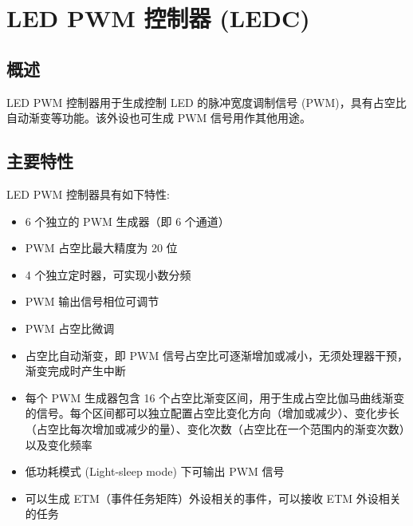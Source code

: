 \documentclass[main\_\_CN.tex]{subfiles}
\begin{document}

\ifglobal
\else
    \listoftodos
    {\let\clearpage\relax \listofdonetodos}
    \tableofcontents
\fi



\hypertarget{ledpwm}{}
\chapter{LED PWM 控制器 (LEDC)}
\label{mod:ledpwm}

\section{概述}

LED PWM 控制器用于生成控制 LED 的脉冲宽度调制信号 (PWM)，具有占空比自动渐变等功能。该外设也可生成 PWM 信号用作其他用途。

\section{主要特性}
LED PWM 控制器具有如下特性:

\begin{itemize}
    \item 6 个独立的 PWM 生成器（即 6 个通道）
    \item PWM 占空比最大精度为 20 位
    \item 4 个独立定时器，可实现小数分频
    \item PWM 输出信号相位可调节
    \item PWM 占空比微调
    \item 占空比自动渐变，即 PWM 信号占空比可逐渐增加或减小，无须处理器干预，渐变完成时产生中断
    \item 每个 PWM 生成器包含 16 个占空比渐变区间，用于生成占空比伽马曲线渐变的信号。每个区间都可以独立配置占空比变化方向（增加或减少）、变化步长（占空比每次增加或减少的量）、变化次数（占空比在一个范围内的渐变次数）以及变化频率
    \item 低功耗模式 (Light-sleep mode) 下可输出 PWM 信号
    \item 可以生成 ETM（事件任务矩阵）外设相关的事件，可以接收 ETM 外设相关的任务
\end{itemize}
\end{document}
